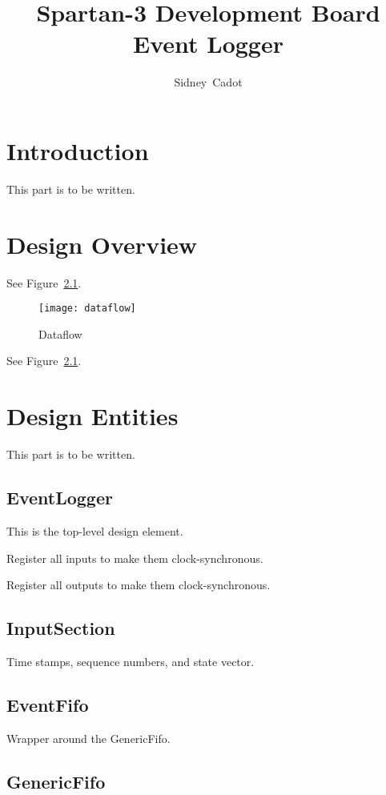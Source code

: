 \documentclass[a4paper,twoside]{report}
\title{Spartan-3 Development Board Event Logger}
\author{Sidney~Cadot}
\begin{document}
%
\maketitle
\tableofcontents
%
\chapter{Introduction}

This part is to be written.

\chapter{Design Overview}

See Figure~\ref{fig:dataflow}.

\begin{figure}[h]
\begin{center}
\texttt{[image: dataflow]}
\end{center}
\caption{Dataflow}
\label{fig:dataflow} %
\end{figure}
%
See Figure~\ref{fig:dataflow}.

\chapter{Design Entities}

This part is to be written.

\section{EventLogger}

This is the top-level design element.

Register all inputs to make them clock-synchronous.

Register all outputs to make them clock-synchronous.

\section{InputSection}

Time stamps, sequence numbers, and state vector.

\section{EventFifo}

Wrapper around the GenericFifo.

\section{GenericFifo}
\end{document}
